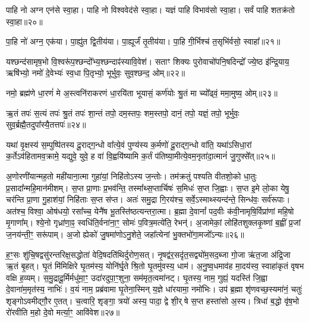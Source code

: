 पाहि नो अग्न एन॑से स्वा॒हा। 
पाहि नो विश्ववेद॑से स्वा॒हा। 
यज्ञं पाहि विभाव॑सो स्वा॒हा। 
सर्वं पाहि शतक्र॑तो स्वा॒हा॥२०॥
\anuvakamend

पा॒हि नो॑ अग्न॒ एक॑या। 
पा॒ह्यु॑त द्वि॒तीय॑या। 
पा॒ह्यूर्जं॑ तृ॒तीय॑या। 
पा॒हि गी॒र्भिश्च॑ त॒सृभि॑र्वसो॒ स्वाहा᳚॥२१॥
\anuvakamend

यश्छन्द॑सामृष॒भो वि॒श्वरू॑प॒श्छन्दो᳚भ्य॒श्छन्दाꣴ॑स्यावि॒वेश॑। 
सताꣳ शिक्यः पुरोवाचो॑पनि॒षदिन्द्रो᳚ ज्ये॒ष्ठ इ॑न्द्रि॒याय॒ ऋषि॑भ्यो॒ नमो॑ दे॒वेभ्यः॑ स्व॒धा पि॒तृभ्यो॒ भूर्भुवः॒ सुव॒श्छन्द॒ ओम्॥२२॥
\anuvakamend


नमो॒ ब्रह्म॑णे धा॒रणं॑ मे अ॒स्त्वनि॑राकरणं धा॒रयि॑ता भूयासं॒ कर्ण॑योः श्रु॒तं मा च्यो᳚ढ्वं॒ ममा॒मुष्य॒ ओम्॥२३॥
\anuvakamend

ऋ॒तं तपः॑ स॒त्यं तपः॑ श्रु॒तं तपः॑ शा॒न्तं तपो॒ दम॒स्तपः॒ शम॒स्तपो॒ दानं॒ तपो॒ यज्ञं॒ तपो॒ भूर्भुवः॒ सुव॒र्ब्रह्मै॒तदुपा᳚स्यै॒तत्तपः॑॥२४॥
\anuvakamend


यथा॑ वृ॒क्षस्य॑ स॒म्पुष्पि॑तस्य दू॒राद्ग॒न्धो वा᳚त्ये॒वं पुण्य॑स्य क॒र्मणो॑ दू॒राद्ग॒न्धो वा॑ति॒ यथा॑ऽसिधा॒रां क॒र्तेऽव॑हितामव॒क्रामे॒ यद्युवे॒ युवे॒ ह वा॑ वि॒ह्वयि॑ष्यामि क॒र्तं प॑तिष्या॒मीत्ये॒वम॒नृता॑दा॒त्मानं॑ जु॒गुफ्से᳚त्॥२५॥
\anuvakamend


अ॒णोरणी॑यान्मह॒तो मही॑याना॒त्मा गुहा॑यां॒ निहि॑तोऽस्य ज॒न्तोः। 
तम॑क्रतुं पश्यति वीतशो॒को धा॒तुः प्र॒सादा᳚न्महि॒मान॑\-मीशम्। 
स॒प्त प्रा॒णाः प्र॒भव॑न्ति॒ तस्मा᳚थ्स॒प्तार्चिषः॑ स॒मिधः॑ स॒प्त जि॒ह्वाः। 
स॒प्त इ॒मे लो॒का येषु॒ चर॑न्ति प्रा॒णा गु॒हाश॑यां॒ निहि॑ताः स॒प्त स॑प्त। 
अतः॑ समु॒द्रा गि॒रय॑श्च॒ सर्वे॒ऽस्माथ्स्यन्द॑न्ते॒ सिन्ध॑वः॒ सर्व॑रूपाः। 
अत॑श्च॒ विश्वा॒ ओष॑धयो॒ रसा᳚च्च॒ येनै॑ष भू॒तस्ति॑ष्ठत्यन्तरा॒त्मा। 
ब्र॒ह्मा दे॒वानां᳚ पद॒वीः क॑वी॒नामृषि॒र्विप्रा॑णां महि॒षो मृ॒गाणा᳚म्। 
श्ये॒नो गृध्रा॑णा॒ꣴ॒ स्वधि॑ति॒र्वना॑ना॒ꣳ॒ सोमः॑ प॒वित्र॒मत्ये॑ति॒ रेभन्॑। 
अ॒जामेकां॒ लोहि॑तशुक्लकृ॒ष्णां ब॒ह्वीं प्र॒जां ज॒नय॑न्ती॒ꣳ॒ सरू॑पाम्। 
अ॒जो ह्येको॑ जु॒षमा॑णोऽनु॒शेते॒ जहा᳚त्येनां भु॒क्तभो॑गा॒मजो᳚ऽन्यः॥२६॥

ह॒ꣳ॒सः शु॑चि॒षद्वसु॑रन्तरिक्ष॒सद्धोता॑ वेदि॒षदति॑थिर्दुरोण॒सत्। 
नृ॒षद्व॑र॒सदृ॑त॒सद्व्यो॑म॒सद॒ब्जा गो॒जा ऋ॑त॒जा अ॑द्रि॒जा ऋ॒तं बृ॒हत्। 
घृ॒तं मि॑मिक्षिरे घृ॒तम॑स्य॒ योनि॑र्घृ॒ते श्रि॒तो घृ॒तमु॑वस्य॒ धाम॑। 
अ॒नु॒ष्व॒धमाव॑ह मा॒दय॑स्व॒ स्वाहा॑कृतं वृषभ वक्षि ह॒व्यम्। 
स॒मु॒द्रादू॒र्मिर्मधु॑मा॒ꣳ॒ उदा॑रदुपा॒ꣳ॒शुना॒ सम॑मृत॒त्वमा॑नट्। 
घृ॒तस्य॒ नाम॒ गुह्यं॒ यदस्ति॑ जि॒ह्वा दे॒वाना॑म॒मृत॑स्य॒ नाभिः॑। 
व॒यं नाम॒ प्रब्र॑वामा घृ॒तेना॒स्मिन् य॒ज्ञे धा॑रयामा॒ नमो॑भिः। 
उप॑ ब्र॒ह्मा शृ॑णवच्छ॒स्यमा॑नं॒ चतुः॑ शृङ्गोऽवमीद्गौ॒र ए॒तत्। 
च॒त्वारि॒ शृङ्गा॒ त्रयो॑ अस्य॒ पादा॒ द्वे शी॒र्\mbox{}षे स॒प्त हस्ता॑सो अ॒स्य। 
त्रिधा॑ ब॒द्धो वृ॑ष॒भो रो॑रवीति म॒हो दे॒वो मर्त्या॒ꣳ॒ आवि॑वेश॥२७॥

